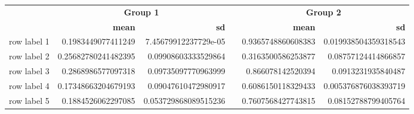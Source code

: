 \begin{tabular}{lrrcrr} 
\toprule 
  	 & 	 \multicolumn{2}{c}{\textbf{Group 1}} 	 & 	 \textbf{ } 	 & 	 \multicolumn{2}{c}{\textbf{Group 2}} \\ 
\cmidrule(r){2-3} 	 \cmidrule(r){5-6} 	  
  	 & 	 \textbf{mean} 	 & 	 \textbf{sd} 	 & 	 \textbf{ } 	 & 	 \textbf{mean} 	 & 	 \textbf{sd} \\ 
\midrule 
row label 1 	 & 	 0.1983449077411249 	 & 	 7.45679912237729e-05 	 & 	   	 & 	 0.9365748860608383 	 & 	 0.019938504359318543 \\ 
row label 2 	 & 	 0.25682780241482395 	 & 	 0.09908603333529864 	 & 	   	 & 	 0.3163500586253877 	 & 	 0.08757124414866857 \\ 
row label 3 	 & 	 0.2868986577097318 	 & 	 0.09735097770963999 	 & 	   	 & 	 0.866078142520394 	 & 	 0.0913231935840487 \\ 
row label 4 	 & 	 0.17348663204679193 	 & 	 0.09047610472980917 	 & 	   	 & 	 0.6086150118329433 	 & 	 0.005376876038393719 \\ 
row label 5 	 & 	 0.1884526062297085 	 & 	 0.053729868089515236 	 & 	   	 & 	 0.7607568427743815 	 & 	 0.08152788799405764 \\ 
\bottomrule 
\end{tabular}